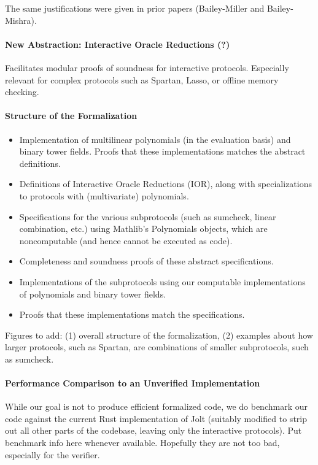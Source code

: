 The same justifications were given in prior papers (Bailey-Miller and Bailey-Mishra).


\paragraph{New Abstraction: Interactive Oracle Reductions (?)}


Facilitates modular proofs of soundness for interactive protocols. Especially relevant for complex protocols such as Spartan, Lasso, or offline memory checking.



\paragraph{Structure of the Formalization}

\begin{itemize}
    \item Implementation of multilinear polynomials (in the evaluation basis) and binary tower fields. Proofs that these implementations matches the abstract definitions.
    \item Definitions of Interactive Oracle Reductions (IOR), along with specializations to protocols with (multivariate) polynomials.
    \item Specifications for the various subprotocols (such as sumcheck, linear combination, etc.) using Mathlib's Polynomials objects, which are noncomputable (and hence cannot be executed as code).
    \item Completeness and soundness proofs of these abstract specifications.
    \item Implementations of the subprotocols using our computable implementations of polynomials and binary tower fields.
    \item Proofs that these implementations match the specifications.
\end{itemize}

{\color{red} Figures to add: (1) overall structure of the formalization, (2) examples about how larger protocols, such as Spartan, are combinations of smaller subprotocols, such as sumcheck.}



\paragraph{Performance Comparison to an Unverified Implementation} While our goal is not to produce efficient formalized code, we do benchmark our code against the current Rust implementation of Jolt (suitably modified to strip out all other parts of the codebase, leaving only the interactive protocols). {\color{red} Put benchmark info here whenever available. Hopefully they are not too bad, especially for the verifier.}


